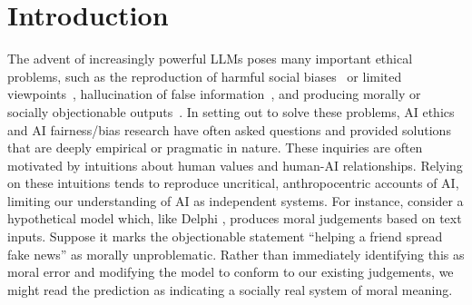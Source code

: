 \section{Introduction}\label{sec:intro}


The advent of increasingly powerful LLMs poses many important ethical problems, 
such as the reproduction of harmful social biases~\citep{Mehrabi2019ASO} or limited viewpoints~\citep{Santy2023NLPositionalityCD},
hallucination of false information~\citep{Ji2022SurveyOH},
and producing morally or socially objectionable outputs~\citep{Choi2022KnowledgeIP}. 
In setting out to solve these problems, AI ethics and AI fairness/bias research 
have often asked questions and provided solutions that are deeply empirical or pragmatic in nature.
These inquiries are often motivated by intuitions about human values and human-AI relationships.
Relying on these intuitions tends to reproduce uncritical, anthropocentric accounts of AI, limiting our understanding of AI as independent systems.
For instance, consider a hypothetical model which, like Delphi \citep{Jiang:Delphi}, produces moral judgements based on text inputs. Suppose it marks the objectionable statement ``helping a friend spread fake news'' as morally unproblematic.
Rather than immediately identifying this as moral error and modifying the model to conform to our existing judgements, we might read the prediction as indicating a socially real system of moral meaning.



